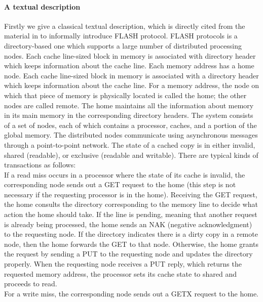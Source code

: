 \documentclass{llncs}
\newcommand{\bedt}[1]{{\color{blue}#1}}
\begin{document}
\paragraph*{A textual description}Firstly we give a classical textual description, which is directly cited from the material in \cite{Park2000} to informally introduce FLASH protocol.
FLASH protocols is a directory-based one which supports a large number of distributed processing nodes. Each cache line-sized block in memory is associated with directory header which keeps information about the \bedt{cache} line. Each memory address has a home node. Each cache line-sized block in memory is associated
with a directory header which keeps information about the \bedt{cache} line. For a memory \bedt{address}, the
node on which that piece of memory is physically located is called the home; the other
nodes are called remote. The home maintains all the information about memory in
its main memory in the corresponding directory headers.
The system consists of a set of nodes, each of which contains a processor, caches, and
a portion of the global memory. The distributed nodes communicate using asynchronous
messages through a point-to-point network. The state of a cached copy is in either invalid,
shared (readable), or exclusive (readable and writable). There are typical kinds of transactions as follows:\\%
 If a read miss occurs in a processor where the state of its cache is invalid, the corresponding node sends out a GET request to the
home (this step is not necessary if the requesting processor is in the home). Receiving the
GET request, the home consults the directory corresponding to the memory line to decide
what action the home should take. If the line is pending, meaning that another request
is already being processed, the home sends an NAK (negative acknowledgment) to the
requesting node. If the directory indicates there is a dirty copy in a remote node, then the
home forwards the GET to that node. Otherwise, the home grants the request by sending
a PUT to the requesting node and updates the directory properly. When the requesting
node receives a PUT reply, which returns the requested memory \bedt{address}, the processor sets
its cache state to shared and proceeds to read.\\%
 For a write miss, the corresponding node sends out a GETX request to the home.
\end{document}

